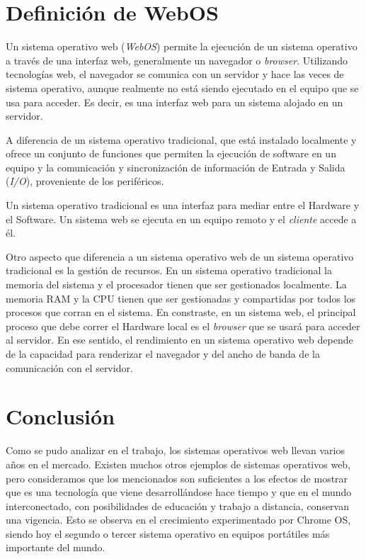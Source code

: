 \documentclass[11pt]{article}
\begin{document}


\pagebreak

\section*{Definición de WebOS}

Un sistema operativo web (\textit{WebOS}) permite la ejecución de un sistema
operativo a través de una interfaz web, generalmente un navegador o
\textit{browser}. Utilizando tecnologías web, el navegador se comunica con un
servidor y hace las veces de sistema operativo, aunque realmente no está siendo
ejecutado en el equipo que se usa para acceder. Es decir, es una interfaz web
para un sistema alojado en un servidor.

A diferencia de un sistema operativo tradicional, que está instalado localmente
y ofrece un conjunto de funciones que permiten la ejecución de software en un
equipo y la comunicación y sincronización de información de Entrada y Salida
(\textit{I/O}), proveniente de los periféricos.

Un sistema operativo tradicional es una interfaz para mediar entre el Hardware
y el Software. Un sistema web se ejecuta en un equipo remoto y el
\textit{cliente} accede a él.

Otro aspecto que diferencia a un sistema operativo web de un sistema operativo
tradicional es la gestión de recursos. En un sistema operativo tradicional la
memoria del sistema y el procesador tienen que ser gestionados localmente. La
memoria RAM y la CPU tienen que ser gestionadas y compartidas por todos los
procesos que corran en el sistema. En constraste, en un sistema web, el
principal proceso que debe correr el Hardware local es el \textit{browser} que
se usará para acceder al servidor. En ese sentido, el rendimiento en un sistema
operativo web depende de la capacidad para renderizar el navegador y del ancho
de banda de la comunicación con el servidor.

\pagebreak

\section*{Conclusión}

Como se pudo analizar en el trabajo, los sistemas operativos web llevan varios 
años en el mercado. Existen muchos otros ejemplos de sistemas operativos web,
pero consideramos que los mencionados son suficientes a los efectos de mostrar
que es una tecnología que viene desarrollándose hace tiempo y que en el mundo 
interconectado, con posibilidades de educación y trabajo a distancia, conservan 
una vigencia. Esto se observa en el crecimiento experimentado por Chrome OS, 
siendo hoy el segundo o tercer sistema operativo en equipos portátiles más 
importante del mundo. 
\end{document}
